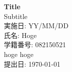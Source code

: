 \documentclass[uplatex,a4paper,11pt]{jsarticle}
\begin{document}
\begin{titlepage}
    \centering
    \vspace*{1cm}
    
    \Large{\textbf{Title}}\\
    \vspace{1.5cm}
    \Large{Subtitle}\\
	\large{実施日: YY/MM/DD}\\
    \vspace{2cm}
    \large{氏名: Hoge}\\
    \large{学籍番号: 082150521}\\
	\large{hoge hoge}\\
    \vfill
    提出日: \today\\
\end{titlepage}
\end{document}
